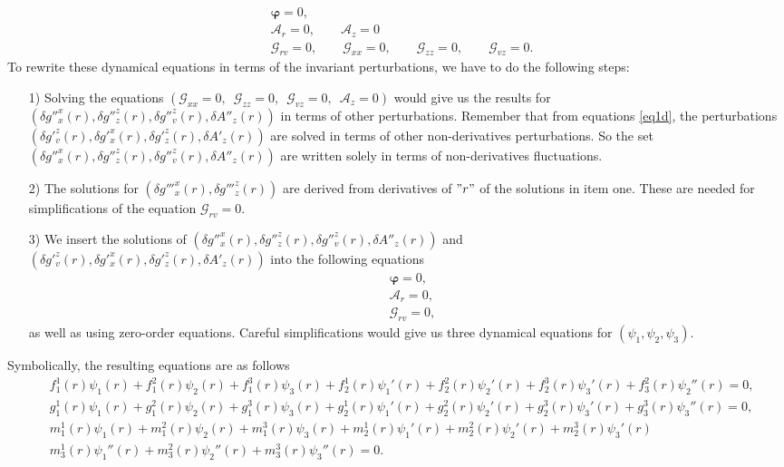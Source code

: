 \documentclass[preprintnumbers,aps,prd,longbibliography,nofootinbib,nobibnotes,amsmath,amssymb]{revtex4}
\begin{document}
\begin{align}
	&\boldsymbol{\varphi} = 0, \nonumber\\
	&\mathcal{A}_{r} = 0, \qquad \mathcal{A}_{z} = 0\nonumber\\
	& \mathcal{G}_{r v} = 0, \qquad \mathcal{G}_{x x} = 0, \qquad \mathcal{G}_{z z} = 0, \qquad \mathcal{G}_{v z} = 0.
\end{align}
To rewrite these dynamical equations in terms of the invariant perturbations, we have to do the following steps:
\begin{itemize}
	\item[1)] Solving the  equations $\left( \mathcal{G}_{x x} = 0, \,\,\, \mathcal{G}_{z z} = 0, \,\,\, \mathcal{G}_{v z} = 0, \,\,\, \mathcal{A}_{z} = 0\right)$ would give us the results  for $(\delta g''^x_x(r), \delta g''^z_z(r), \delta g''^z_v(r), \delta A''_z(r))$ in terms of other perturbations. Remember that from equations \eqref{eq1d}, the perturbations  $\left(\delta g'^{z}_v(r), \delta g'^{x}_x(r), \delta g'^z_z(r), \delta A'_z(r)\right)$ are solved in terms of other non-derivatives perturbations. So the set $(\delta g''^x_x(r), \delta g''^z_z(r), \delta g''^z_v(r), \delta A''_z(r))$ are written solely in terms of non-derivatives fluctuations.
	\item[2)] The solutions for $(\delta g'''^x_x(r), \delta g'''^z_z(r))$ are derived from derivatives of $"r"$ of the solutions in item one. These  are needed for simplifications of the equation $\mathcal{G}_{r v} = 0$.
	\item[3)] We insert the solutions of $(\delta g''^x_x(r), \delta g''^z_z(r), \delta g''^z_v(r), \delta A''_z(r))$ and \\
	$\left(\delta g'^{z}_v(r), \delta g'^{x}_x(r), \delta g'^z_z(r), \delta A'_z(r)\right)$ into the following equations
	\begin{align}
		&\boldsymbol{\varphi} = 0, \nonumber\\
		&\mathcal{A}_{r} = 0,\nonumber\\
		& \mathcal{G}_{r v} = 0, 
	\end{align}
	as well as using  zero-order equations. Careful simplifications would give us three dynamical equations for $\left(\psi_1, \psi_2, \psi_3\right)$.
\end{itemize}
  Symbolically, the resulting equations are as follows
	\begin{align}\label{eqinvariant}
		&f^1_1(r) \psi_1(r) + f^2_1(r) \psi_2(r) + f^3_1(r) \psi_3(r) +f^1_2(r) \psi_1'(r) +f^2_2(r) \psi_2'(r) +f^3_2(r) \psi_3'(r) +f^2_3(r) \psi_2''(r) = 0,\nonumber\\
		&g^1_1(r) \psi_1(r) + g^2_1(r) \psi_2(r) + g^3_1(r) \psi_3(r) +g^1_2(r) \psi_1'(r) +g^2_2(r) \psi_2'(r) +g^3_2(r) \psi_3'(r) +g^3_3(r) \psi_3''(r) = 0,\nonumber\\
		&m^1_1(r) \psi_1(r) + m^2_1(r) \psi_2(r) + m^3_1(r) \psi_3(r) +m^1_2(r) \psi_1'(r) +m^2_2(r) \psi_2'(r) +m^3_2(r) \psi_3'(r) \nonumber\\
		&m^1_3(r) \psi_1''(r) + m^2_3(r) \psi_2''(r) + m^3_3(r) \psi_3''(r) = 0.
	\end{align}
\end{document}
